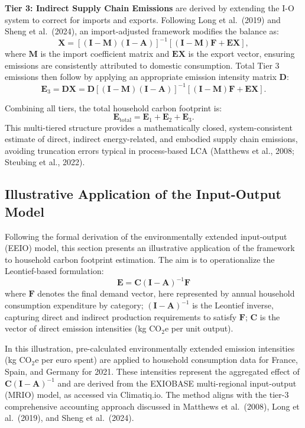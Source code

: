\documentclass[12pt,a4paper]{article}%
\begin{document}
\textbf{Tier 3: Indirect Supply Chain Emissions} are derived by extending the I-O system to correct for imports and exports. Following Long et al.\ (2019) and Sheng et al.\ (2024), an import-adjusted framework modifies the balance as:
\begin{equation}
    \mathbf{X} = [(\mathbf{I} - \mathbf{M})(\mathbf{I} - \mathbf{A})]^{-1} [(\mathbf{I} - \mathbf{M})\mathbf{F} + \mathbf{EX}],
\end{equation}
where \( \mathbf{M} \) is the import coefficient matrix and \( \mathbf{EX} \) is the export vector, ensuring emissions are consistently attributed to domestic consumption. Total Tier 3 emissions then follow by applying an appropriate emission intensity matrix \( \mathbf{D} \):
\begin{equation}
    \mathbf{E}_3 = \mathbf{D} \mathbf{X} = \mathbf{D} [(\mathbf{I} - \mathbf{M})(\mathbf{I} - \mathbf{A})]^{-1} [(\mathbf{I} - \mathbf{M})\mathbf{F} + \mathbf{EX}].
\end{equation}

Combining all tiers, the total household carbon footprint is:
\begin{equation}
    \mathbf{E}_{\text{total}} = \mathbf{E}_1 + \mathbf{E}_2 + \mathbf{E}_3.
\end{equation}
This multi-tiered structure provides a mathematically closed, system-consistent estimate of direct, indirect energy-related, and embodied supply chain emissions, avoiding truncation errors typical in process-based LCA (Matthews et al., 2008; Steubing et al., 2022).
\subsection{Illustrative Application of the Input-Output Model}

Following the formal derivation of the environmentally extended input-output (EEIO) model, this section presents an illustrative application of the framework to household carbon footprint estimation. The aim is to operationalize the Leontief-based formulation:
\[
\mathbf{E} = \mathbf{C} {(\mathbf{I}-\mathbf{A})}^{-1} \mathbf{F}
\]
where $\mathbf{F}$ denotes the final demand vector, here represented by annual household consumption expenditure by category; ${(\mathbf{I}-\mathbf{A})}^{-1}$ is the Leontief inverse, capturing direct and indirect production requirements to satisfy $\mathbf{F}$; $\mathbf{C}$ is the vector of direct emission intensities (kg CO$_{2}$e per unit output).

In this illustration, pre-calculated environmentally extended emission intensities (kg CO$_{2}$e per euro spent) are applied to household consumption data for France, Spain, and Germany for 2021. These intensities represent the aggregated effect of $\mathbf{C} {(\mathbf{I}-\mathbf{A})}^{-1}$ and are derived from the EXIOBASE multi-regional input-output (MRIO) model, as accessed via Climatiq.io. The method aligns with the tier-3 comprehensive accounting approach discussed in Matthews et al.~(2008), Long et al.~(2019), and Sheng et al.~(2024).
\end{document}

